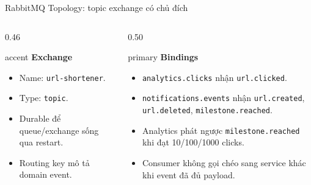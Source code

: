 \documentclass[aspectratio=169]{beamer}
\begin{document}
\begin{frame}{RabbitMQ Topology: topic exchange có chủ đích}
    \begin{columns}[T,onlytextwidth]
        \begin{column}{0.46\textwidth}
            \begin{claimbox}{accent}
                \textbf{Exchange}
                \begin{itemize}\small
                    \item Name: \texttt{url-shortener}.
                    \item Type: \texttt{topic}.
                    \item Durable để queue/exchange sống qua restart.
                    \item Routing key mô tả domain event.
                \end{itemize}
            \end{claimbox}
        \end{column}
        \begin{column}{0.50\textwidth}
            \begin{claimbox}{primary}
                \textbf{Bindings}
                \begin{itemize}\small
                    \item \texttt{analytics.clicks} nhận \texttt{url.clicked}.
                    \item \texttt{notifications.events} nhận \texttt{url.created}, \texttt{url.deleted}, \texttt{milestone.reached}.
                    \item Analytics phát ngược \texttt{milestone.reached} khi đạt 10/100/1000 clicks.
                    \item Consumer không gọi chéo sang service khác khi event đã đủ payload.
                \end{itemize}
            \end{claimbox}
        \end{column}
    \end{columns}
\end{frame}
\end{document}

